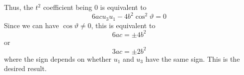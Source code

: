 \documentclass[12 pt, letterpaper]{hmcpset}
\begin{document}
\begin{solution}
	Thus, the $t^{2}$ coefficient being $0$ is equivalent to 
	\[
		6ac u_{3} u_{1} - 4 b ^{2} \cos^{2}{\vartheta} = 0
	\]
	Since we can have $\cos{\vartheta} \neq 0$, this is equivalent to
	\[
		6ac = \pm 4b^{2}
	\]
	or
	\[
		3ac = \pm 2b^{2}
	\]
	where the sign depends on whether $u_{1}$ and $u_{3}$ have the same sign. This is the desired result.
\end{solution}
\end{document}
